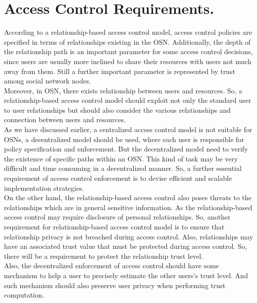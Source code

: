 \documentclass[24pt]{article}
\begin{document}
\section*{Access Control Requirements.}
According to a relationship-based access control model, access control
policies are specified in terms of relationships existing in the
OSN. Additionally, the depth of the relationship path is an important
parameter for some access control decisions, since users are usually
more inclined to share their resources with users not much away from
them. Still a further important parameter is represented by trust
among social network nodes. \\
Moreover, in OSN, there exists relationship between users and
resources. So, a relationship-based access control model should
exploit not only the standard user to user relationships but should
also consider the various relationships and connection between users
and resources. \\
As we have discussed earlier, a centralized access control model is
not suitable for OSNs, a decentralized model should be used, where
each user is responsible for policy specification and enforcement. But
the decentralized model need to verify the existence of specific paths
within an OSN. This kind of task may be very difficult and time
consuming in a decentralized manner. So, a further essential
requirement of access control enforcement is to devise efficient and
scalable implementation strategies. \\
On the other hand, the relationship-based access control also poses
threats to the relationships which are in general sensitive
information. As the relationship-based access control may require
disclosure of personal relationships. So, another requirement for
relationship-based access control model is to ensure that relationship
privacy is not breached during access control. Also, relationships may
have an associated trust value that must be protected during access
control. So, there will be a requirement to protect the relationship
trust level.\\
Also, the decentralized enforcement of access control should have some
mechanism to help a user to precisely estimate the other users's trust
level. And such mechanism should also preserve user privacy when
performing trust computation. 
\end{document}
